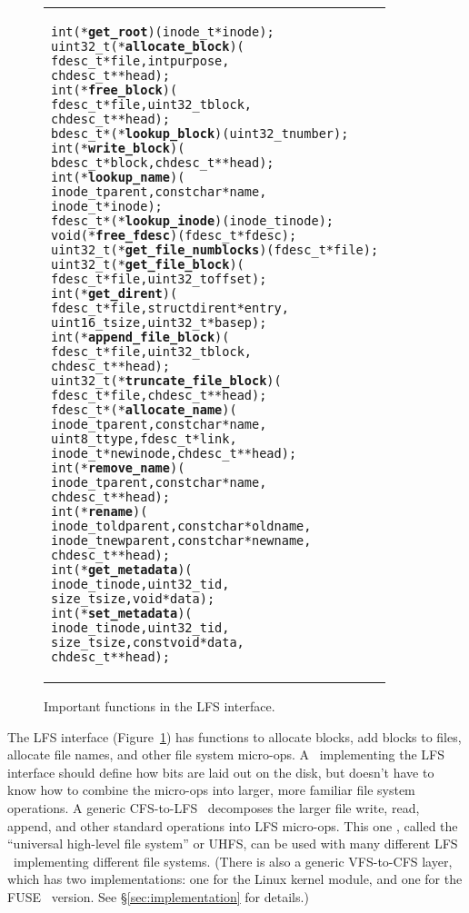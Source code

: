 \begin{figure}[htb]
\vskip-14pt
\begin{tabular}{@{\hskip0.25in}p{2in}@{}}
\begin{scriptsize}
\begin{alltt}
int (*\textbf{get_root})(inode_t *inode);
uint32_t (*\textbf{allocate_block})(
    fdesc_t *file, int purpose,
    chdesc_t **head);
int (*\textbf{free_block})(
    fdesc_t *file, uint32_t block,
    chdesc_t **head);
bdesc_t *(*\textbf{lookup_block})(uint32_t number);
int (*\textbf{write_block})(
    bdesc_t *block, chdesc_t **head);
int (*\textbf{lookup_name})(
    inode_t parent, const char *name,
    inode_t *inode);
fdesc_t *(*\textbf{lookup_inode})(inode_t inode);
void (*\textbf{free_fdesc})(fdesc_t *fdesc);
uint32_t (*\textbf{get_file_numblocks})(fdesc_t *file);
uint32_t (*\textbf{get_file_block})(
    fdesc_t *file, uint32_t offset);
int (*\textbf{get_dirent})(
    fdesc_t *file, struct dirent *entry,
    uint16_t size, uint32_t *basep);
int (*\textbf{append_file_block})(
    fdesc_t *file, uint32_t block,
    chdesc_t **head);
uint32_t (*\textbf{truncate_file_block})(
    fdesc_t *file, chdesc_t **head);
fdesc_t *(*\textbf{allocate_name})(
    inode_t parent, const char *name,
    uint8_t type, fdesc_t *link,
    inode_t *newinode, chdesc_t **head);
int (*\textbf{remove_name})(
    inode_t parent, const char *name,
    chdesc_t **head);
int (*\textbf{rename})(
    inode_t oldparent, const char *oldname,
    inode_t newparent, const char *newname,
    chdesc_t **head);
int (*\textbf{get_metadata})(
    inode_t inode, uint32_t id,
    size_t size, void *data);
int (*\textbf{set_metadata})(
    inode_t inode, uint32_t id,
    size_t size, const void *data,
    chdesc_t **head);
\end{alltt}
\end{scriptsize}
\end{tabular}
\vspace{-10pt}
\caption{\label{fig:lfs} Important functions in the LFS interface.}
\end{figure}

The LFS interface (Figure~\ref{fig:lfs}) has functions to allocate blocks, add
blocks to files, allocate file names, and other file system micro-ops. A
\module\ implementing the LFS interface should define how bits are laid out on
the disk, but doesn't have to know how to combine the micro-ops into larger,
more familiar file system operations. A generic CFS-to-LFS \module\ decomposes
the larger file write, read, append, and other standard operations into LFS
micro-ops. This one \module, called the ``universal high-level file system'' or
UHFS, can be used with many different LFS \modules\ implementing different file
systems. (There is also a generic VFS-to-CFS layer, which has two
implementations: one for the Linux kernel module, and one for the
FUSE~\cite{fuse} version. See \S\ref{sec:implementation} for details.)

